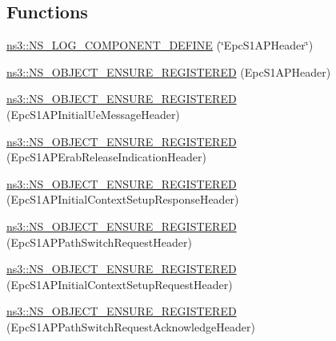 \subsection*{Functions}
\begin{DoxyCompactItemize}
\item 
\hyperlink{namespacens3_a6de94bc4179d4e0ff289f6e4342ec5c9}{ns3\+::\+N\+S\+\_\+\+L\+O\+G\+\_\+\+C\+O\+M\+P\+O\+N\+E\+N\+T\+\_\+\+D\+E\+F\+I\+NE} (\char`\"{}Epc\+S1\+A\+P\+Header\char`\"{})
\item 
\hyperlink{namespacens3_a44ce05375feb6d212fe923d870d4a492}{ns3\+::\+N\+S\+\_\+\+O\+B\+J\+E\+C\+T\+\_\+\+E\+N\+S\+U\+R\+E\+\_\+\+R\+E\+G\+I\+S\+T\+E\+R\+ED} (Epc\+S1\+A\+P\+Header)
\item 
\hyperlink{namespacens3_ae2a0bafcdae60e09c8422f7a29097140}{ns3\+::\+N\+S\+\_\+\+O\+B\+J\+E\+C\+T\+\_\+\+E\+N\+S\+U\+R\+E\+\_\+\+R\+E\+G\+I\+S\+T\+E\+R\+ED} (Epc\+S1\+A\+P\+Initial\+Ue\+Message\+Header)
\item 
\hyperlink{namespacens3_a228c2b86efa4f57f0396cc3956fa7073}{ns3\+::\+N\+S\+\_\+\+O\+B\+J\+E\+C\+T\+\_\+\+E\+N\+S\+U\+R\+E\+\_\+\+R\+E\+G\+I\+S\+T\+E\+R\+ED} (Epc\+S1\+A\+P\+Erab\+Release\+Indication\+Header)
\item 
\hyperlink{namespacens3_ada17fdf4ad8dbf21eed90fba83e01aaa}{ns3\+::\+N\+S\+\_\+\+O\+B\+J\+E\+C\+T\+\_\+\+E\+N\+S\+U\+R\+E\+\_\+\+R\+E\+G\+I\+S\+T\+E\+R\+ED} (Epc\+S1\+A\+P\+Initial\+Context\+Setup\+Response\+Header)
\item 
\hyperlink{namespacens3_ad5b76be2a03b433e91d12a56a9567b05}{ns3\+::\+N\+S\+\_\+\+O\+B\+J\+E\+C\+T\+\_\+\+E\+N\+S\+U\+R\+E\+\_\+\+R\+E\+G\+I\+S\+T\+E\+R\+ED} (Epc\+S1\+A\+P\+Path\+Switch\+Request\+Header)
\item 
\hyperlink{namespacens3_ab55b3e62a3742288edc2e3929b05f0ae}{ns3\+::\+N\+S\+\_\+\+O\+B\+J\+E\+C\+T\+\_\+\+E\+N\+S\+U\+R\+E\+\_\+\+R\+E\+G\+I\+S\+T\+E\+R\+ED} (Epc\+S1\+A\+P\+Initial\+Context\+Setup\+Request\+Header)
\item 
\hyperlink{namespacens3_ae39b4a2a4af0cffad4e005f27401c30c}{ns3\+::\+N\+S\+\_\+\+O\+B\+J\+E\+C\+T\+\_\+\+E\+N\+S\+U\+R\+E\+\_\+\+R\+E\+G\+I\+S\+T\+E\+R\+ED} (Epc\+S1\+A\+P\+Path\+Switch\+Request\+Acknowledge\+Header)
\end{DoxyCompactItemize}
